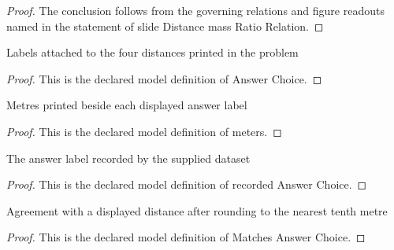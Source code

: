 \begin{proof}
  The conclusion follows from the governing relations and figure readouts named in the statement of slide Distance mass Ratio Relation.
\end{proof}
\begin{definition}
  \label{def:physics:phyx-mini-0766:phyxminiproblems-problemphyxmini0766-answerchoice}
  Labels attached to the four distances printed in the problem
\end{definition}
\begin{proof}
  This is the declared model definition of Answer Choice.
\end{proof}
\begin{definition}[meters]
  \label{def:physics:phyx-mini-0766:phyxminiproblems-problemphyxmini0766-answerchoice-meters}
  Metres printed beside each displayed answer label
\end{definition}
\begin{proof}
  This is the declared model definition of meters.
\end{proof}
\begin{definition}
  \label{def:physics:phyx-mini-0766:phyxminiproblems-problemphyxmini0766-recordedanswerchoice}
  The answer label recorded by the supplied dataset
\end{definition}
\begin{proof}
  This is the declared model definition of recorded Answer Choice.
\end{proof}
\begin{definition}
  \label{def:physics:phyx-mini-0766:phyxminiproblems-problemphyxmini0766-matchesanswerchoice}
  Agreement with a displayed distance after rounding to the nearest tenth metre
\end{definition}
\begin{proof}
  This is the declared model definition of Matches Answer Choice.
\end{proof}
